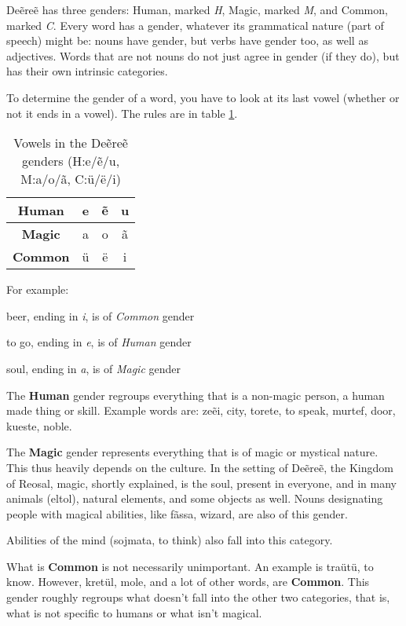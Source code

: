 Deẽreẽ has three genders: Human, marked \emph{H}, Magic, marked \emph{M}, and Common, marked
\emph{C}. Every word has a gender, whatever its grammatical nature (part of speech) might be: nouns
have gender, but verbs have gender too, as well as adjectives. Words that are not nouns do not just
agree in gender (if they do), but has their own intrinsic categories.

To determine the gender of a word, you have to look at its last vowel (whether or not it ends in a
vowel). The rules are in table \ref{tab:morph-genders}.

\begin{table}[h]\label{tab:morph-genders}
\begin{center}
\begin{tabular}{|c|ccc|}
\hline
\textbf{Human}  & e & ẽ & u\\\hline
\textbf{Magic}  & a & o & ã\\\hline
\textbf{Common} & ü & ë & i\\\hline
\end{tabular}
\end{center}
\caption{Vowels in the Deẽreẽ genders (H:e/ẽ/u, M:a/o/ã, C:ü/ë/i)}
\end{table}

For example:
\begin{description}
\item[\gls{zhalbarki}] beer, ending in \emph{i}, is of \emph{Common} gender
\item[\gls{drete}] to go, ending in \emph{e}, is of \emph{Human} gender
\item[\gls{magra}] soul, ending in \emph{a}, is of \emph{Magic} gender
\end{description}

The \textbf{Human} gender regroups everything that is a non-magic person, a human made thing or
skill. Example words are: \gls{zeẽi}, city, 
\gls{torete}, to speak, \gls{murtef}, door, \gls{kueste},
noble.

The \textbf{Magic} gender represents everything that is of magic or mystical nature. This thus
heavily depends on the culture. In the setting of Deẽreẽ, the Kingdom of Reosal, magic, shortly
explained, is the soul, present in everyone, and in many animals (\gls{eltol}),
natural elements, and some objects as well. Nouns designating people with magical abilities, like
\gls{fãssa}, wizard, are also of this gender.

Abilities of the mind (\gls{sojmata}, to think) also fall into this
category.

What is \textbf{Common} is not necessarily unimportant. An example is 
\gls{traütü}, to know. However, \gls{kretül}, mole, and a lot of other words,
are \textbf{Common}. This gender roughly regroups what doesn’t fall into the other two categories,
that is, what is not specific to humans or what isn’t magical.

